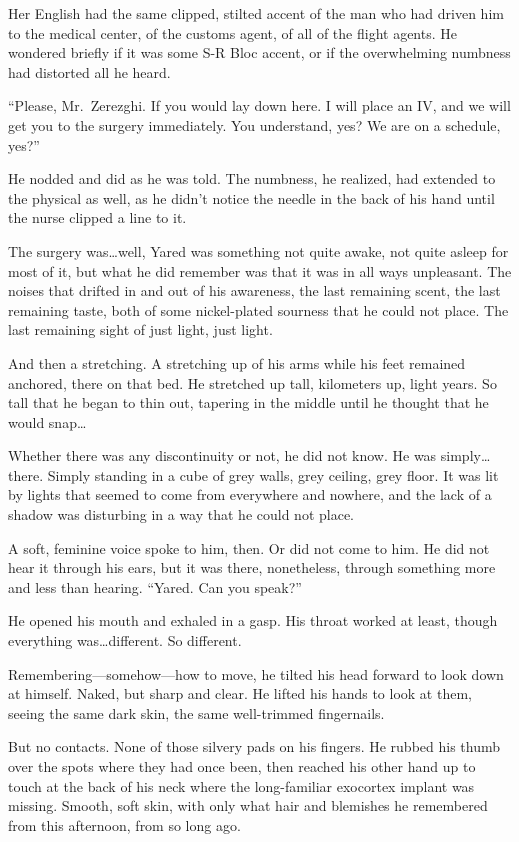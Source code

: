 Her English had the same clipped, stilted accent of the man who had driven him to the medical center, of the customs agent, of all of the flight agents. He wondered briefly if it was some S-R Bloc accent, or if the overwhelming numbness had distorted all he heard.

``Please, Mr.~Zerezghi. If you would lay down here. I will place an IV, and we will get you to the surgery immediately. You understand, yes? We are on a schedule, yes?''

He nodded and did as he was told. The numbness, he realized, had extended to the physical as well, as he didn't notice the needle in the back of his hand until the nurse clipped a line to it.

The surgery was\ldots well, Yared was something not quite awake, not quite asleep for most of it, but what he did remember was that it was in all ways unpleasant. The noises that drifted in and out of his awareness, the last remaining scent, the last remaining taste, both of some nickel-plated sourness that he could not place. The last remaining sight of just light, just light.

And then a stretching. A stretching up of his arms while his feet remained anchored, there on that bed. He stretched up tall, kilometers up, light years. So tall that he began to thin out, tapering in the middle until he thought that he would snap\ldots{}

Whether there was any discontinuity or not, he did not know. He was simply\ldots there. Simply standing in a cube of grey walls, grey ceiling, grey floor. It was lit by lights that seemed to come from everywhere and nowhere, and the lack of a shadow was disturbing in a way that he could not place.

A soft, feminine voice spoke to him, then. Or did not come to him. He did not hear it through his ears, but it was there, nonetheless, through something more and less than hearing. ``Yared. Can you speak?''

He opened his mouth and exhaled in a gasp. His throat worked at least, though everything was\ldots different. So different.

Remembering---somehow---how to move, he tilted his head forward to look down at himself. Naked, but sharp and clear. He lifted his hands to look at them, seeing the same dark skin, the same well-trimmed fingernails.

But no contacts. None of those silvery pads on his fingers. He rubbed his thumb over the spots where they had once been, then reached his other hand up to touch at the back of his neck where the long-familiar exocortex implant was missing. Smooth, soft skin, with only what hair and blemishes he remembered from this afternoon, from so long ago.


